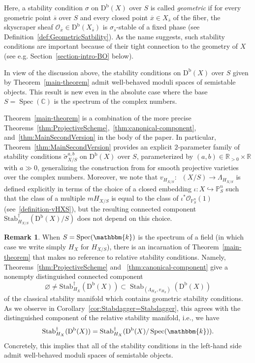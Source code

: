 \documentclass[11pt, reqno]{amsart}
\numberwithin{equation}{section}
\theoremstyle{plain}
\theoremstyle{remark}
\theoremstyle{definition}
\newtheorem{remark}[theorem]{Remark}
\theoremstyle{italicsname}
\newcommand{\wtilde}{\widetilde}
\newcommand{\Db}{\mathrm{D^b}}
\newcommand{\num}{\mathrm{num}}
\DeclareMathOperator{\Knum}{\rK_{\num}}
\DeclareMathOperator{\Stab}{Stab}
\newcommand{\Stabdagger}{\mathrm{Stab}^\dagger}
\DeclareMathOperator{\Spec}{Spec}
\newcommand{\cO}{\mathcal{O}}
\newcommand{\rK}{\mathrm{K}}
\newcommand{\KK}{\mathbbm{k}}
\def\CC{\ensuremath{\mathbb{C}}}
\def\RR{\ensuremath{\mathbb{R}}}
\def\PP{\ensuremath{\mathbb{P}}}
\begin{document}
Here, a stability condition $\sigma$ on $\Db(X)$ over $S$ is called \emph{geometric} if for every geometric point $\overline{s}$ over $S$ and every closed point $\overline{x} \in X_{\overline{s}}$ of the fiber, the skyscraper sheaf $\cO_{\overline{x}} \in \Db(X_{\overline{s}})$ is $\sigma_{\overline{s}}$-stable of a fixed phase (see Definition~\ref{def:GeometricSatbility}).  
As the name suggests, such stability conditions are important because of their tight connection to the geometry of $X$ (see e.g. Section~\ref{section-intro-BO} below). 

In view of the discussion above, the stability conditions on $\Db(X)$ over $S$ given by Theorem~\ref{main-theorem} admit well-behaved moduli spaces of semistable objects. 
This result is new even in the absolute case where the base $S = \Spec(\CC)$ is the spectrum of the complex numbers. 

Theorem~\ref{main-theorem} is a combination of the more precise Theorems~\ref{thm:ProjectiveScheme},~\ref{thm:canonical-component}, and~\ref{thm:MainSecondVersion} in the body of the paper. 
In particular, Theorem~\ref{thm:MainSecondVersion} provides an explicit $2$-parameter family of stability conditions $\wtilde{\sigma}_{X/S}^{a,b}$ on $\Db(X)$ over $S$, parameterized by $(a,b) \in \RR_{>0} \times \RR$ with $a \gg 0$, generalizing the construction from \cite{chunyi-stability} for smooth projective varieties over the complex numbers. 
Moreover, we note that $v_{H_{X/S}} \colon \Knum(X/S) \to \Lambda_{H_{X/S}}$ is defined explicitly in terms of the choice of a closed embedding $\iota \colon X \hookrightarrow \PP^n_S$ such that the class of a multiple $mH_{X/S}$ is equal to the class of $\iota^*\cO_{\PP^n_S}(1)$ (see~\eqref{definition-vHXS}), but the resulting connected component $\Stabdagger_{{H_{X/S}}}(\Db(X)/S)$ does not depend on this choice. 

\begin{remark}
    When $S = \Spec(\KK)$ is the spectrum of a field (in which case we write simply $H_X$ for $H_{X/S}$), there is an incarnation of Theorem~\ref{main-theorem} that makes no reference to relative stability conditions. Namely, Theorems~\ref{thm:ProjectiveScheme} and ~\ref{thm:canonical-component} give a nonempty distinguished connected component 
    \begin{equation*}
        \varnothing \neq \Stabdagger_{H_X}(\Db(X)) \subset \Stab_{(\Lambda_{H_X}, v_{H_X})}(\Db(X)) 
    \end{equation*}
    of the classical stability manifold which contains geometric stability conditions. As we observe in Corollary~\ref{cor:Stabdagger=Stabdagger}, this agrees with the distinguished component of the relative stability manifold, i.e., we have  
    \begin{equation*}
        \Stabdagger_{H_X}(\Db(X)) = \Stabdagger_{H_X}(\Db(X)/\Spec(\KK)). 
    \end{equation*}
Concretely, this implies that all of the stability conditions in the left-hand side admit well-behaved moduli spaces of semistable objects. 
\end{remark}
\end{document}
